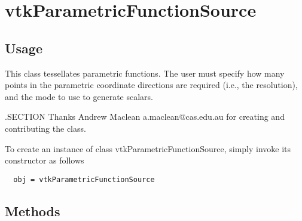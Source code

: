 \section{vtkParametricFunctionSource}

\subsection{Usage}

 This class tessellates parametric functions. The user must specify how
 many points in the parametric coordinate directions are required (i.e.,
 the resolution), and the mode to use to generate scalars. 

 .SECTION Thanks
 Andrew Maclean a.maclean@cas.edu.au for creating and contributing the
 class.


To create an instance of class vtkParametricFunctionSource, simply
invoke its constructor as follows
\begin{verbatim}
  obj = vtkParametricFunctionSource
\end{verbatim}
\subsection{Methods}

